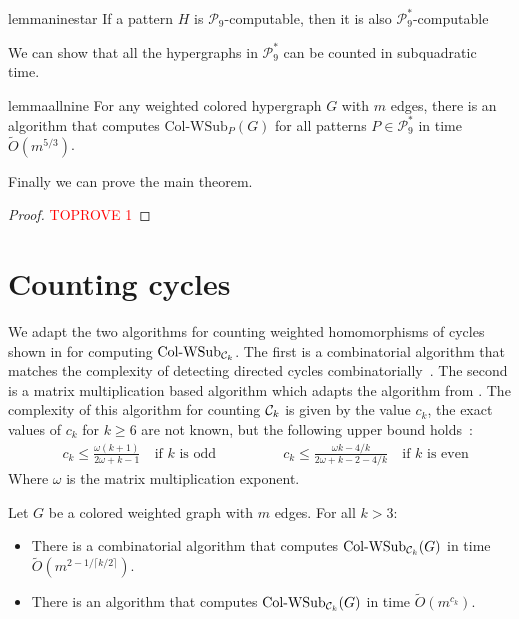 \documentclass[a4paper,UKenglish,cleveref, autoref, numberwithinsect, thm-restate]{lipics-v2021}
\newcommand{\computable}[1]{${#1}$-computable}
\newcommand{\cycle}[1]{\cC_{#1}}
\newcommand{\WSub}[2]{\mathrm{\text{Col-WSub}}_{#2}(#1)}
\newcommand{\WSubNI}[1]{\mathrm{\text{Col-WSub}}_{#1}}
\newcommand{\cC}{{\cal C}}
\newcommand{\cP}{\mathcal{P}}
\begin{document}
	\begin{restatable}{lemma}{ninestar} \label{lem:nine_star}
		If a pattern $H$ is \computable{\cP_9}, then it is also \computable{\cP^*_9}
	\end{restatable}

	We can show that all the hypergraphs in $\cP^*_9$ can be counted in subquadratic time.
	
	\begin{restatable}{lemma}{allnine} \label{lem:allnine}
			For any weighted colored hypergraph $G$ with $m$ edges, there is an algorithm that computes $\WSub{G}{P}$ for all patterns $P \in \cP^*_9$ in time $\tilde{O}(m^{5/3})$.
	\end{restatable}


	Finally we can prove the main theorem.
	
	\main*
	\begin{proof}\textcolor{red}{TOPROVE 1}\end{proof}

	\section{Counting cycles} \label{sec:wsub}
	
	We adapt the two algorithms for counting weighted homomorphisms of cycles shown in \cite{GiLeSh+23} for computing $\WSubNI{\cycle{k}}$. The first is a combinatorial algorithm that matches the complexity of detecting directed cycles combinatorially~\cite{AlYuZw97}. The second is a matrix multiplication based algorithm which adapts the algorithm from \cite{YuZw04}. The complexity of this algorithm for counting $\cycle{k}$ is given by the value $c_k$, the exact values of $c_k$ for $k\geq 6$ are not known, but the following upper bound holds~\cite{DaVuWi19}:
	\begin{equation}
	\begin{split} 
		&c_k \leq \frac{\omega(k+1)}{2\omega+k-1}\ &\text{if $k$ is odd} \qquad\qquad
		&c_k \leq \frac{\omega k - 4/k}{2 \omega + k - 2 - 4/k}\ &\text{if $k$ is even}
	\end{split}
	\end{equation}
	Where $\omega$ is the matrix multiplication exponent.
	\begin{lemma} \label{lem:wsub_cycles}
		Let $G$ be a colored weighted graph with $m$ edges. For all $k>3$:
		\begin{itemize}
			\item There is a combinatorial algorithm that computes $\WSub{G}{\cycle{k}}$ in time $\tilde{O}(m^{2-1/\lceil k/2 \rceil })$.
			\item There is an algorithm that computes $\WSub{G}{\cycle{k}}$ in time $\tilde{O}(m^{c_k})$.
		\end{itemize}
	\end{lemma}
\end{document}
